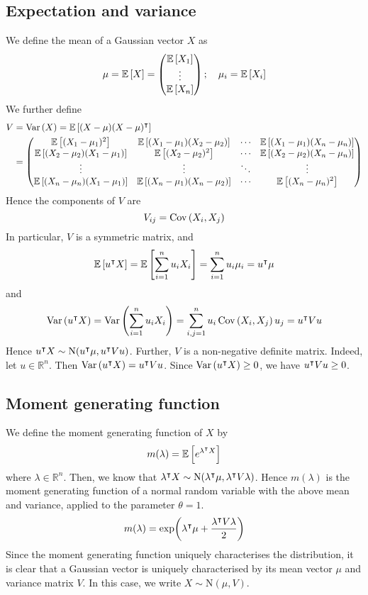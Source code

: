 \subsection{Expectation and variance}
We define the mean of a Gaussian vector \(X\) as
\[
	\mu = \mathbb{E}\left[{X}\right] = \begin{pmatrix}
		\mathbb{E}\left[{X_1}\right] \\ \vdots \\ \mathbb{E}\left[{X_n}\right]
	\end{pmatrix};\quad \mu_i = \mathbb{E}\left[{X_i}\right]
\]
We further define
\begin{align*}
	V & = \operatorname{Var}\left({X}\right) = \mathbb{E}\left[{(X - \mu) (X - \mu)^\intercal}\right]                                                                        \\
	  & = \begin{pmatrix}
		      \mathbb{E}\left[{(X_1 - \mu_1)^2}\right]            & \mathbb{E}\left[{(X_1 - \mu_1)(X_2 - \mu_2)}\right] & \cdots & \mathbb{E}\left[{(X_1 - \mu_1)(X_n - \mu_n)}\right] \\
		      \mathbb{E}\left[{(X_2 - \mu_2)(X_1 - \mu_1)}\right] & \mathbb{E}\left[{(X_2 - \mu_2)^2}\right]            & \cdots & \mathbb{E}\left[{(X_2 - \mu_2)(X_n - \mu_n)}\right] \\
		      \vdots                              & \vdots                              & \ddots & \vdots                              \\
		      \mathbb{E}\left[{(X_n - \mu_n)(X_1 - \mu_1)}\right] & \mathbb{E}\left[{(X_n - \mu_1)(X_n - \mu_2)}\right] & \cdots & \mathbb{E}\left[{(X_n - \mu_n)^2}\right]
	      \end{pmatrix}
\end{align*}
Hence the components of \(V\) are
\[
	V_{ij} = \operatorname{Cov}\left({X_i, X_j}\right)
\]
In particular, \(V\) is a symmetric matrix, and
\[
	\mathbb{E}\left[{u^\intercal X}\right] = \mathbb{E}\left[{\sum_{i=1}^n u_i X_i}\right] = \sum_{i=1}^n u_i \mu_i = u^\intercal \mu
\]
and
\[
	\operatorname{Var}\left({u^\intercal X}\right) = \operatorname{Var}\left({\sum_{i=1}^n u_i X_i}\right) = \sum_{i,j = 1}^n u_i \operatorname{Cov}\left({X_i, X_j}\right) u_j = u^\intercal V u
\]
Hence \(u^\intercal X \sim \mathrm{N}(u^\intercal \mu, u^\intercal V u)\).
Further, \(V\) is a non-negative definite matrix.
Indeed, let \(u \in \mathbb R^n\).
Then \(\operatorname{Var}\left({u^\intercal X}\right) = u^\intercal V u\).
Since \(\operatorname{Var}\left({u^\intercal X}\right) \geq 0\), we have \(u^\intercal V u \geq 0\).

\subsection{Moment generating function}
We define the moment generating function of \(X\) by
\[
	m(\lambda) = \mathbb{E}\left[{e^{\lambda^\intercal X}}\right]
\]
where \(\lambda \in \mathbb R^n\).
Then, we know that \(\lambda^\intercal X \sim \mathrm{N}(\lambda^\intercal \mu, \lambda^\intercal V \lambda)\).
Hence \(m(\lambda)\) is the moment generating function of a normal random variable with the above mean and variance, applied to the parameter \(\theta = 1\).
\[
	m(\lambda) = \exp(\lambda^\intercal \mu + \frac{\lambda^\intercal V\lambda}{2})
\]
Since the moment generating function uniquely characterises the distribution, it is clear that a Gaussian vector is uniquely characterised by its mean vector \(\mu\) and variance matrix \(V\).
In this case, we write \(X \sim \mathrm{N}(\mu, V)\).

